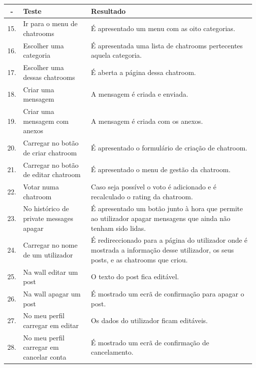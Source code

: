 \documentclass[a4paper, 12pt]{article}
\begin{document}
\cleardoublepage
\begin{center}
    \begin{tabular}{| c | p{5cm} | p{9cm} |} \hline
        \-- &   \textbf{Teste}                          &   \textbf{Resultado}\\ \hline
        15. &   Ir para o menu de chatrooms             &   É apresentado um menu com as oito categorias.\\ \hline
        16. &   Escolher uma categoria                  &   É apresentada uma lista de chatrooms pertecentes aquela categoria.\\ \hline
        17. &   Escolher uma dessas chatrooms           &   É aberta a página dessa chatroom.\\ \hline
        18. &   Criar uma mensagem                      &   A mensagem é criada e enviada.\\ \hline
        19. &   Criar uma mensagem com anexos           &   A mensagem é criada com os anexos.\\ \hline
        20. &   Carregar no botão de criar chatroom     &   É apresentado o formulário de criação de chatroom.\\ \hline
        21. &   Carregar no botão de editar chatroom    &   É apresentado o menu de gestão da chatroom.\\ \hline
        22. &   Votar numa chatroom                     &   Caso seja possível o voto é adicionado e é recalculado o rating da chatroom.\\ \hline
        23. &   No histórico de private messages apagar &   É apresentado um botão junto à hora que permite ao utilizador apagar mensagens que ainda não tenham sido lidas.\\ \hline
        24. &   Carregar no nome de um utilizador       &   É redireccionado para a página do utilizador onde é mostrada a informação desse utilizador, os seus posts, e as chatrooms que criou.\\ \hline
        25. &   Na wall editar um post                  &   O texto do post fica editável.\\ \hline
        26. &   Na wall apagar um post                  &   É mostrado um ecrã de confirmação para apagar o post.\\ \hline
        27. &   No meu perfil carregar em editar        &   Os dados do utilizador ficam editáveis.\\ \hline
        28. &   No meu perfil carregar em cancelar conta&   É mostrado um ecrã de confirmação de cancelamento.\\ \hline
    \end{tabular}
\end{center}
\cleardoublepage
\end{document}
